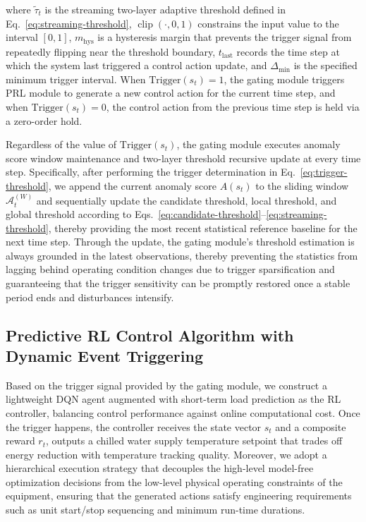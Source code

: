 \documentclass[preprint,12pt,number]{elsarticle}
\begin{document}
\noindent where \(\tilde{\tau}_t\) is the streaming two-layer adaptive threshold defined in Eq.~\eqref{eq:streaming-threshold}, \(\operatorname{clip}(\cdot, 0, 1)\) constrains the input value to the interval \([0,1]\), \(m_{\mathrm{hys}}\) is a hysteresis margin that prevents the trigger signal from repeatedly flipping near the threshold boundary, \(t_{\mathrm{last}}\) records the time step at which the system last triggered a control action update, and \(\Delta_{\min}\) is the specified minimum trigger interval. When \(\mathrm{Trigger}(s_t)=1\), the gating module triggers PRL module to generate a new control action for the current time step, and when \(\mathrm{Trigger}(s_t)=0\), the control action from the previous time step is held via a zero-order hold.

Regardless of the value of \(\mathrm{Trigger}(s_t)\), the gating module executes anomaly score window maintenance and two-layer threshold recursive update at every time step. Specifically, after performing the trigger determination in Eq.~\eqref{eq:trigger-threshold}, we append the current anomaly score \(A(s_t)\) to the sliding window \(\mathcal{A}_t^{(W)}\) and sequentially update the candidate threshold, local threshold, and global threshold according to Eqs.~\eqref{eq:candidate-threshold}--\eqref{eq:streaming-threshold}, thereby providing the most recent statistical reference baseline for the next time step. Through the update, the gating module's threshold estimation is always grounded in the latest observations, thereby preventing the statistics from lagging behind operating condition changes due to trigger sparsification and guaranteeing that the trigger sensitivity can be promptly restored once a stable period ends and disturbances intensify.

\subsection{Predictive RL Control Algorithm with Dynamic Event Triggering}\label{predictive-rl-control-algorithm-with-dynamic-event-triggering}

Based on the trigger signal provided by the gating module, we construct a lightweight DQN agent augmented with short-term load prediction as the RL controller, balancing control performance against online computational cost. Once the trigger happens, the controller receives the state vector \(s_t\) and a composite reward \(r_t\), outputs a chilled water supply temperature setpoint that trades off energy reduction with temperature tracking quality. Moreover, we adopt a hierarchical execution strategy that decouples the high-level model-free optimization decisions from the low-level physical operating constraints of the equipment, ensuring that the generated actions satisfy engineering requirements such as unit start/stop sequencing and minimum run-time durations.
\end{document}

